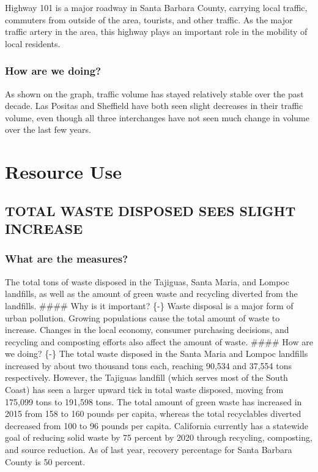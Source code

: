 \documentclass[]{book}
\theoremstyle{definition}
\theoremstyle{definition}
\theoremstyle{definition}
\theoremstyle{remark}
\begin{document}
Highway 101 is a major roadway in Santa Barbara County, carrying local
traffic, commuters from outside of the area, tourists, and other
traffic. As the major traffic artery in the area, this highway plays an
important role in the mobility of local residents.

\subsubsection*{How are we doing?}\label{how-are-we-doing-32}

As shown on the graph, traffic volume has stayed relatively stable over
the past decade. Las Positas and Sheffield have both seen slight
decreases in their traffic volume, even though all three interchanges
have not seen much change in volume over the last few years.

\section*{Resource Use}\label{resource-use}

\subsection*{TOTAL WASTE DISPOSED SEES SLIGHT
INCREASE}\label{total-waste-disposed-sees-slight-increase}

\subsubsection*{What are the measures?}\label{what-are-the-measures-6}

The total tons of waste disposed in the Tajiguas, Santa Maria, and
Lompoc landfills, as well as the amount of green waste and recycling
diverted from the landfills. \#\#\#\# Why is it important? \{-\} Waste
disposal is a major form of urban pollution. Growing populations cause
the total amount of waste to increase. Changes in the local economy,
consumer purchasing decisions, and recycling and composting efforts also
affect the amount of waste. \#\#\#\# How are we doing? \{-\} The total
waste disposed in the Santa Maria and Lompoc landfills increased by
about two thousand tons each, reaching 90,534 and 37,554 tons
respectively. However, the Tajiguas landfill (which serves most of the
South Coast) has seen a larger upward tick in total waste disposed,
moving from 175,099 tons to 191,598 tons. The total amount of green
waste has increased in 2015 from 158 to 160 pounds per capita, whereas
the total recyclables diverted decreased from 100 to 96 pounds per
capita. California currently has a statewide goal of reducing solid
waste by 75 percent by 2020 through recycling, composting, and source
reduction. As of last year, recovery percentage for Santa Barbara County
is 50 percent.
\end{document}

